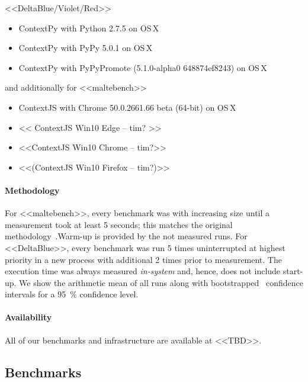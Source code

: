 \documentclass[preprint,english,10pt,nonatbib]{sigplanconf}
\begin{document}
<<DeltaBlue/Violet/Red>>
\begin{itemize}
\item ContextPy with Python 2.7.5 on OS\,X
\item ContextPy with PyPy 5.0.1 on OS\,X
\item ContextPy with PyPyPromote (5.1.0-alpha0 648874ef8243) on OS\,X
\end{itemize}

and additionally for <<maltebench>>
\begin{itemize}
\item ContextJS with Chrome 50.0.2661.66 beta (64-bit) on OS\,X
\item << ContextJS Win10 Edge -- tim? >>
\item <<ContextJS Win10 Chrome -- tim?>>
\item <<(ContextJS Win10 Firefox -- tim?)>>
\end{itemize}

\paragraph{Methodology} 
For <<maltebench>>, every benchmark was with increasing size until a
measurement took at least 5 seconds; this matches the original
methodology~\cite{appeltauer+:2009:comparison-context-oriented}.Warm-up is
provided by the not measured runs.
For <<DeltaBlue>>, every benchmark was run 5 times uninterrupted at highest
priority in a new process with additional 2 times prior to measurement.
The execution time was always measured \emph{in-system} and, hence, does not include start-up.
We show the arithmetic mean of all  runs along with
bootstrapped~\cite{davison+:1997:confidence-intervals} confidence intervals
for a \SI{95}{\percent} confidence level.


\paragraph{Availability}  All of our benchmarks and infrastructure
 are available at <<TBD>>.


\subsection{Benchmarks}
\end{document}
